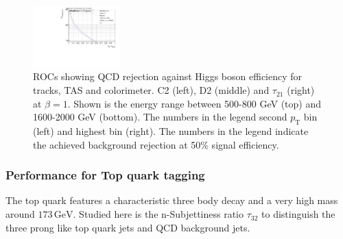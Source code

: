 \begin{figure}[htp]
\includegraphics[width=0.3\textwidth]{sascha_input/plots/Higgs/ROC/Beta1/ROC_ALL_h_recoJet_nSub21_bin5.pdf}
\caption{\footnotesize{ROCs showing QCD rejection against Higgs boson efficiency for tracks, TAS and colorimeter. C2 (left), D2 (middle) and $\tau_{21}$ (right) at $\beta=1$. Shown is the energy range between 500-800 GeV (top) and 1600-2000 GeV (bottom). The numbers in the legend second $p_{\mathrm{T}}$ bin (left) and highest bin (right). The numbers in the legend indicate the achieved background rejection at 50\% signal efficiency.}}\label{fig:ROC_higgs_nSub21}
\end{figure}

\subsubsection{Performance for Top quark tagging}
The top quark features a characteristic three body decay and a very high mass around $173 \, \text{GeV}$. Studied here is the n-Subjettiness ratio $\tau_{32}$ to distinguish the three prong like top quark jets and QCD background jets.


